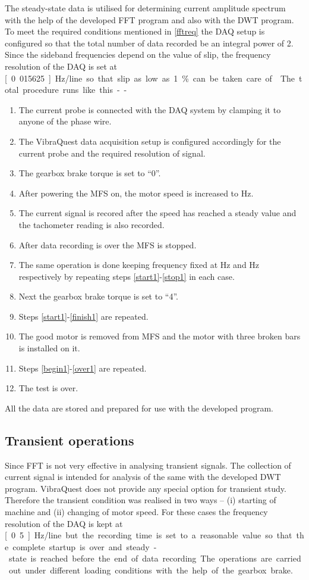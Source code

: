 \documentclass[a4paper,11pt]{report}
\begin{document}
The steady-state data is utilised for determining current amplitude spectrum with the help of the developed FFT program and also with the DWT program. To meet the required conditions mentioned in \ref{fftreq} the DAQ setup is configured so that the total number of data recorded be an integral power of 2. Since the sideband frequencies depend on the value of slip, the frequency resolution of the DAQ is set at \unit[0.015625]{Hz/line} so that slip as low as 1\% can be taken care of \cite{t32pg145}. 

The total procedure runs like this --

\begin{enumerate}
\item The current probe is connected with the DAQ system by clamping it to anyone of the phase wire.
\item The VibraQuest data acquisition setup is configured accordingly for the current probe and the required resolution of signal.
\item The gearbox brake torque is set to ``0''. \label{begin1}
\item After powering the MFS on, the motor speed is increased to \unit[30]{Hz}. \label{start1}
\item The current signal is recored after the speed has reached a steady value and the tachometer reading is also recorded.
\item After data recording is over the MFS is stopped. \label{stop1}
\item The same operation is done keeping frequency fixed at \unit[40]{Hz} and \unit[50]{Hz} respectively by repeating steps \ref{start1}-\ref{stop1} in each case. \label{finish1}
\item Next the gearbox brake torque is set to ``4''.
\item Steps \ref{start1}-\ref{finish1} are repeated. \label{over1}
\item The good motor is removed from MFS and the motor with three broken bars is installed on it.
\item Steps \ref{begin1}-\ref{over1} are repeated.
\item The test is over.
\end{enumerate}

All the data are stored and prepared for use with the developed program.

\subsection{Transient operations}
Since FFT is not very effective in analysing transient signals. The collection of current signal is intended for analysis of the same with the developed DWT program. VibraQuest does not provide any special option for transient study. Therefore the transient condition was realised in two ways -- (i) starting of machine and (ii) changing of motor speed. For these cases the frequency resolution of the DAQ is kept at \unit[0.5]{Hz/line} but the recording time is set to a reasonable value so that the complete startup is over and steady-state is reached before the end of data recording. The operations are carried out under different loading conditions with the help of the gearbox brake.
\end{document}
